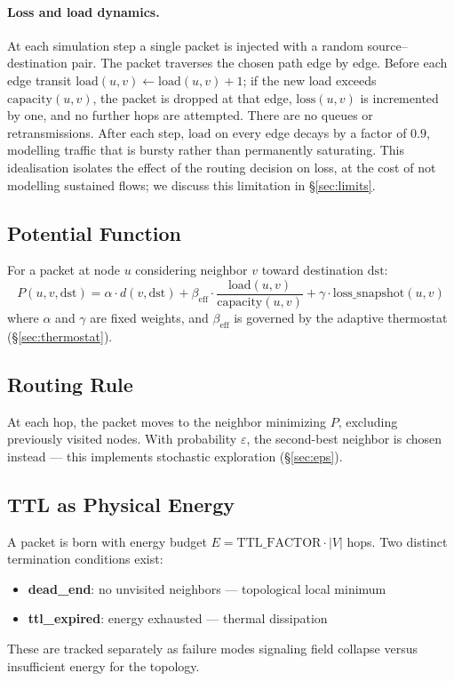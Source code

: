 \documentclass[11pt,a4paper]{article}
\begin{document}
\paragraph{Loss and load dynamics.} At each simulation step a single
packet is injected with a random source--destination pair. The packet
traverses the chosen path edge by edge. Before each edge transit
$\mathrm{load}(u,v) \leftarrow \mathrm{load}(u,v) + 1$; if the new
load exceeds $\mathrm{capacity}(u,v)$, the packet is dropped at that
edge, $\mathrm{loss}(u,v)$ is incremented by one, and no further hops
are attempted. There are no queues or retransmissions. After each
step, $\mathrm{load}$ on every edge decays by a factor of $0.9$,
modelling traffic that is bursty rather than permanently saturating.
This idealisation isolates the effect of the routing decision on
loss, at the cost of not modelling sustained flows; we discuss this
limitation in \S\ref{sec:limits}.

\subsection{Potential Function}

For a packet at node $u$ considering neighbor $v$ toward destination
$\mathrm{dst}$:
\begin{equation}
P(u, v, \mathrm{dst}) = \alpha \cdot d(v, \mathrm{dst})
                      + \beta_{\mathrm{eff}} \cdot
                        \frac{\mathrm{load}(u,v)}{\mathrm{capacity}(u,v)}
                      + \gamma \cdot \mathrm{loss\_snapshot}(u,v)
\end{equation}
where $\alpha$ and $\gamma$ are fixed weights, and
$\beta_{\mathrm{eff}}$ is governed by the adaptive thermostat
(\S\ref{sec:thermostat}).

\subsection{Routing Rule}

At each hop, the packet moves to the neighbor minimizing $P$,
excluding previously visited nodes. With probability $\varepsilon$, the
second-best neighbor is chosen instead --- this implements stochastic
exploration (\S\ref{sec:eps}).

\subsection{TTL as Physical Energy}

A packet is born with energy budget
$E = \mathrm{TTL\_FACTOR} \cdot |V|$ hops. Two distinct termination
conditions exist:
\begin{itemize}[itemsep=1pt]
  \item \textbf{dead\_end}: no unvisited neighbors --- topological
        local minimum
  \item \textbf{ttl\_expired}: energy exhausted --- thermal dissipation
\end{itemize}
These are tracked separately as failure modes signaling field collapse
versus insufficient energy for the topology.
\end{document}
